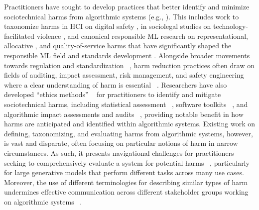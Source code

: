 Practitioners have sought to develop practices that better identify and minimize sociotechnical harms from algorithmic systems (e.g., \cite{Belfield_2020, Cramer_2018, Madaio_2020, Metcalf_Moss_Boyd_2019}).  This includes work to taxonomize harms in HCI on digital safety \cite{ThomasSOK, Scheuerman_Jiang_Fiesler_Brubaker_2021, Agrafiotis_Nurse_Goldsmith_Creese_Upton_2018}, in sociolegal studies on technology-facilitated violence \cite{henry2018technology, Wang_2020}, and canonical responsible ML research on representational, allocative \cite{barocas2017problem}, and quality-of-service harms \cite{blodgett2022responsible} that have significantly shaped the responsible ML field and standards development \cite{Microsoft_2022}. Alongside broader movements towards regulation and standardization ~\cite{Smuha_2021a}, harm reduction practices often draw on fields of auditing, impact assessment, risk management, and safety engineering where a clear understanding of harm is essential ~\cite{Holstein_2019}. Researchers have also developed “ethics methods” ~\cite{Emanuel_Moss_2020} for practitioners to identify and mitigate sociotechnical harms, including statistical assessment ~\cite{Madaio_2020, Metcalf_Moss_Watkins_Singh_Elish_2021}, software toolkits ~\cite{Bird_2020}, and algorithmic impact assessments and audits ~\cite{Raji_Xu_Honigsberg_Ho_2022}, providing notable benefit in how harms are anticipated and identified within algorithmic systems. Existing work on defining, taxonomizing, and evaluating harms from algorithmic systems, however, is vast and disparate, often focusing on particular notions of harm in narrow circumstances. As such, it presents navigational challenges for practitioners seeking to comprehensively evaluate a system for potential harms ~\cite{Raji_Xu_Honigsberg_Ho_2022, Rakova_Yang_Cramer_Chowdhury_2021, Richardson_Garcia-Gathright_Way_Thom_Cramer_2021}, particularly for large generative models that perform different tasks across many use cases. Moreover, the use of different terminologies for describing similar types of harm undermines effective communication across different stakeholder groups working on algorithmic systems ~\cite{Madaio_2020, IEEE2017}.

